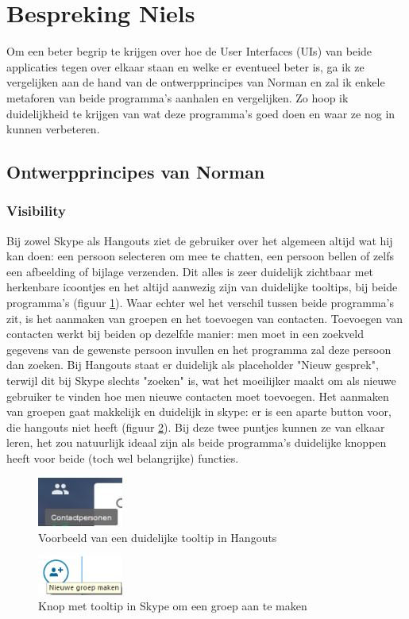 \documentclass[11pt]{article}
\begin{document}
\section{Bespreking Niels}
Om een beter begrip te krijgen over hoe de User Interfaces (UIs) van beide applicaties tegen over elkaar staan en welke er eventueel beter is, ga ik ze vergelijken aan de hand van de ontwerpprincipes van Norman en zal ik enkele metaforen van beide programma's aanhalen en vergelijken. Zo hoop ik duidelijkheid te krijgen van wat deze programma's goed doen en waar ze nog in kunnen verbeteren.
\subsection{Ontwerpprincipes van Norman}
\subsubsection{Visibility}
Bij zowel Skype als Hangouts ziet de gebruiker over het algemeen altijd wat hij kan doen: een persoon selecteren om mee te chatten, een persoon bellen of zelfs een afbeelding of bijlage verzenden. Dit alles is zeer duidelijk zichtbaar met herkenbare icoontjes en het altijd aanwezig zijn van duidelijke tooltips, bij beide programma's (figuur \ref{fig:HTooltips}). Waar echter wel het verschil tussen beide programma's zit, is het aanmaken van groepen en het toevoegen van contacten. Toevoegen van contacten werkt bij beiden op dezelfde manier: men moet in een zoekveld gegevens van de gewenste persoon invullen en het programma zal deze persoon dan zoeken. Bij Hangouts staat er duidelijk als placeholder "Nieuw gesprek", terwijl dit bij Skype slechts "zoeken" is, wat het moeilijker maakt om als nieuwe gebruiker te vinden hoe men nieuwe contacten moet toevoegen. Het aanmaken van groepen gaat makkelijk en duidelijk in skype: er is een aparte button voor, die hangouts niet heeft (figuur \ref{fig:Sgroep}). Bij deze twee puntjes kunnen ze van elkaar leren, het zou natuurlijk ideaal zijn als beide programma's duidelijke knoppen heeft voor beide (toch wel belangrijke) functies.
\newpage
\begin{figure}
	\centering
	\includegraphics[width=0.25\textwidth]{Niels_HTooltips.jpg}
	\caption{Voorbeeld van een duidelijke tooltip in Hangouts}
	\label{fig:HTooltips}
\end{figure}
\begin{figure}
	\centering
	\includegraphics[width=0.25\textwidth]{Niels_groep.png}
	\caption{Knop met tooltip in Skype om een groep aan te maken}
	\label{fig:Sgroep}
\end{figure}
\end{document}
